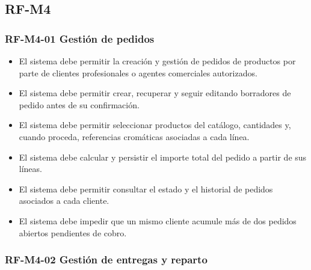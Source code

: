 \subsection{RF-M4}

\vspace{-0.75em}
\subsubsection{RF-M4-01 Gestión de pedidos}
\vspace{-1em}

\begin{itemize}
    \item El sistema debe permitir la creación y gestión de pedidos de productos por parte de clientes profesionales o agentes comerciales autorizados.
    \item El sistema debe permitir crear, recuperar y seguir editando borradores de pedido antes de su confirmación.
    \item El sistema debe permitir seleccionar productos del catálogo, cantidades y, cuando proceda, referencias cromáticas asociadas a cada línea.
    \item El sistema debe calcular y persistir el importe total del pedido a partir de sus líneas.
    \item El sistema debe permitir consultar el estado y el historial de pedidos asociados a cada cliente.
    \item El sistema debe impedir que un mismo cliente acumule más de dos pedidos abiertos pendientes de cobro.
\end{itemize}

\vspace{-0.75em}
\subsubsection{RF-M4-02 Gestión de entregas y reparto}
\vspace{-1em}

